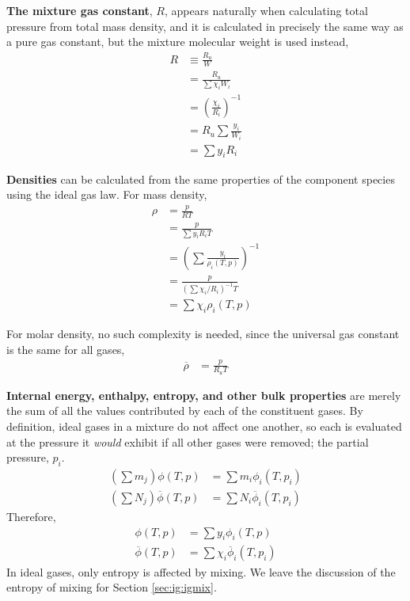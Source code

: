 {\bf The mixture gas constant}, $R$, appears naturally when calculating total pressure from total mass density, and it is calculated in precisely the same way as a pure gas constant, but the mixture molecular weight is used instead,
\begin{subequations}
\begin{align}
R &\equiv \frac{R_u}{W}\\
 &= \frac{R_u}{\sum \chi_i W_i}\nonumber\\
 &= \left( \frac{\chi_i}{R_i} \right)^{-1}\\
 &= R_u \sum \frac{y_i}{W_i}\nonumber\\
 &= \sum y_i R_i
\end{align}
\end{subequations}

{\bf Densities} can be calculated from the same properties of the component species using the ideal gas law.  For mass density,
\begin{subequations}
\begin{align}
\rho &= \frac{p}{R T}\nonumber\\
 &= \frac{p}{\sum y_i R_i T}\nonumber\\
 &= \left(\sum \frac{y_i}{\rho_i(T,p)} \right)^{-1}\\
 &= \frac{p}{\left(\sum \chi_i / R_i\right)^{-1} T}\nonumber\\
 &= \sum \chi_i \rho_i(T,p)
\end{align}
\end{subequations}

For molar density, no such complexity is needed, since the universal gas constant is the same for all gases,
\begin{align}
\overline{\rho} &= \frac{p}{R_u T}\nonumber
\end{align}

{\bf Internal energy, enthalpy, entropy, and other bulk properties} are merely the sum of all the values contributed by each of the constituent gases.  By definition, ideal gases in a mixture do not affect one another, so each is evaluated at the pressure it \emph{would} exhibit if all other gases were removed; the partial pressure, $p_i$.
\begin{align}
\left(\sum m_j\right) \phi(T,p) &= \sum m_i \phi_i(T,p_i)\nonumber\\
\left(\sum N_j \right) \overline{\phi}(T,p) &= \sum N_i \overline{\phi}_i(T,p_i)\nonumber
\end{align}
Therefore, 
\begin{align}
\phi(T,p) &= \sum y_i \phi_i(T,p)\nonumber\\
\overline{\phi}(T,p) &= \sum \chi_i \overline{\phi}_i(T,p_i)\nonumber
\end{align}
In ideal gases, only entropy is affected by mixing.  We leave the discussion of the entropy of mixing for Section \ref{sec:ig:igmix}.

